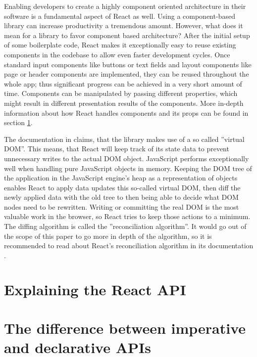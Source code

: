 Enabling developers to create a highly component oriented architecture in their software is a fundamental aspect of React as well. Using a component-based library can increase productivity a tremendous amount. However, what does it mean for a library to favor component based architecture? After the initial setup of some boilerplate code, React makes it exceptionally easy to reuse existing components in the codebase to allow even faster development cycles. Once standard input components like buttons or text fields and layout components like page or header components are implemented, they can be reused throughout the whole app; thus significant progress can be achieved in a very short amount of time. Components can be manipulated by passing different properties, which might result in different presentation results of the components. More in-depth information about how React handles components and its props can be found in section \ref{sec:reactApi}.
    
The documentation in \cite{React} claims, that the library makes use of a so called ''virtual DOM''. This means, that React will keep track of its state data to prevent unnecessary writes to the actual DOM object. JavaScript performs exceptionally well when handling pure JavaScript objects in memory. Keeping the DOM tree of the application in the JavaScript engine's heap as a representation of objects enables React to apply data updates this so-called virtual DOM, then diff the newly applied data with the old tree to then being able to decide what DOM nodes need to be rewritten. Writing or committing the real DOM is the most valuable work in the browser, so React tries to keep those actions to a minimum. The diffing algorithm is called the ''reconciliation algorithm''. It would go out of the scope of this paper to go more in depth of the algorithm, so it is recommended to read about React's reconciliation algorithm in its documentation \cite{React}.

\section{Explaining the React API}
\label{sec:reactApi}

\section{The difference between imperative and declarative APIs}


